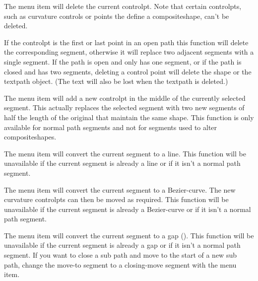 
The  menu item will delete the current
\gls{controlpt}. 
Note that certain \glspl{controlpt}, such as curvature controls or points
the define a \gls{compositeshape}, can't be deleted.

If the \gls{controlpt} is the first or last point in an open path
this function will delete the corresponding segment, otherwise it
will replace two adjacent segments with a single segment.  If the
path is open and only has one segment, or if the path is closed and
has two segments, deleting a control point will delete the
\gls{shape} or the \gls{textpath} object. (The text will also be lost when
the \gls{textpath} is deleted.)


The  menu item will add a new
\gls{controlpt} in the middle of the currently selected segment.
This actually replaces the selected segment with two new segments of 
half the length of the original that maintain the same shape.
This function is only available for normal path segments and not for
segments used to alter \glspl{compositeshape}.


The  menu item will convert the
current segment to a line. This function will be unavailable if the
current segment is already a line or if it isn't a normal path segment.


The  menu item will convert the
current segment to a \gls{Bezier-curve}. The new curvature 
\glspl{controlpt} can then be moved as required.
This function will be unavailable if the
current segment is already a \gls{Bezier-curve} or if it isn't a normal path segment.


The  menu item will convert the
current segment to a \gls{gap} (). This function will be
unavailable if the current segment is already a \gls{gap} or if it
isn't a normal path segment.
If you want to close a sub path and move to the start of a new sub
path, change the \gls{move-to} segment to a \gls{closing-move}
segment with the  menu item.


